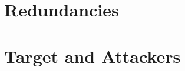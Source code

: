 \section{Redundancies}

\section{Target and Attackers}





\begin{comment}
\section{Multidimensional graph}
We expect a data representation where we have a multipartitioned graph, meaning there is a number of different nodes representing different kinds of entities with multiple edges, representing different relations, in between the nodes. Hence, we will then obtain a multidimensional network. 

\section{Analysis}
As far as the analysis goes, we expect to perform clustering to identify communities and link analysis to find different paths between two nodes. The latter can easily be queried in Neo4j and is expected to contribute a great deal solving the different questions. We also expect to use of some statistical tools such as average node degree, degree distribution and network diameter.
\end{comment}